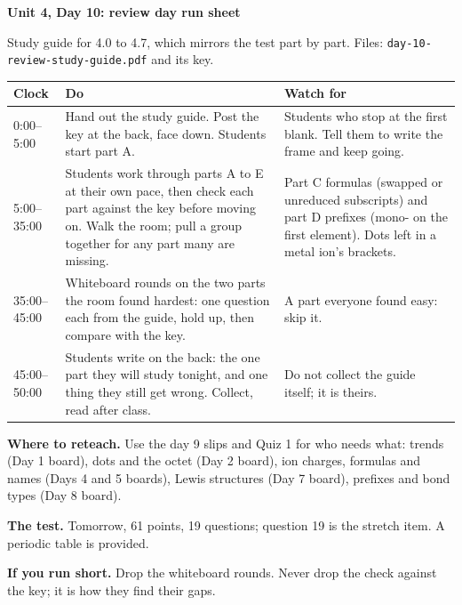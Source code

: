 \documentclass[11pt]{article}
\begin{document}
{\LARGE\bfseries Unit 4, Day 10: review day run sheet}\par
Study guide for 4.0 to 4.7, which mirrors the test part by part. Files: \texttt{day-10-review-study-guide.pdf} and its key.\par\medskip
\begin{tabular}{@{}p{1.1in}p{2.4in}p{3.1in}@{}}
\textbf{Clock} & \textbf{Do} & \textbf{Watch for}\\\hline
0:00--5:00 & Hand out the study guide. Post the key at the back, face down. Students start part A. & Students who stop at the first blank. Tell them to write the frame and keep going.\\
5:00--35:00 & Students work through parts A to E at their own pace, then check each part against the key before moving on. Walk the room; pull a group together for any part many are missing. & Part C formulas (swapped or unreduced subscripts) and part D prefixes (mono- on the first element). Dots left in a metal ion's brackets.\\
35:00--45:00 & Whiteboard rounds on the two parts the room found hardest: one question each from the guide, hold up, then compare with the key. & A part everyone found easy: skip it.\\
45:00--50:00 & Students write on the back: the one part they will study tonight, and one thing they still get wrong. Collect, read after class. & Do not collect the guide itself; it is theirs.\\
\end{tabular}\par\medskip
\textbf{Where to reteach.} Use the day 9 slips and Quiz 1 for who needs what: trends (Day 1 board), dots and the octet (Day 2 board), ion charges, formulas and names (Days 4 and 5 boards), Lewis structures (Day 7 board), prefixes and bond types (Day 8 board).\par
\textbf{The test.} Tomorrow, 61 points, 19 questions; question 19 is the stretch item. A periodic table is provided.\par
\textbf{If you run short.} Drop the whiteboard rounds. Never drop the check against the key; it is how they find their gaps.
\end{document}
